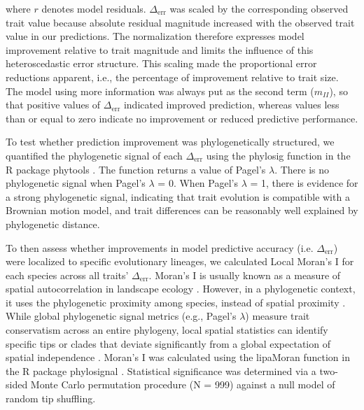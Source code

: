 \documentclass[preprint,12pt,authoryear]{elsarticle}
\begin{document}
where $r$ denotes model residuals. 
$\Delta_\mathrm{err}$ was scaled by the corresponding observed trait value because absolute residual magnitude increased with the observed trait value in our predictions. The normalization therefore expresses model improvement relative to trait magnitude and limits the influence of this heteroscedastic error structure.
This scaling made the proportional error reductions apparent, i.e., the percentage of improvement relative to trait size. The model using more information was always put as the second term ($m_{II}$), so that positive values of {$\Delta_\mathrm{err}$} indicated improved prediction, whereas values less than or equal to zero indicate no improvement or reduced predictive performance.

To test whether prediction improvement was phylogenetically structured, we quantified the phylogenetic signal of each $\Delta_\mathrm{err}$ using the phylosig function in the R package phytools \citep{revell2024phytools}. The function returns a value of Pagel's $\lambda$. There is no phylogenetic signal when Pagel's $\lambda$ = 0. When Pagel's $\lambda$ = 1, there is evidence for a strong phylogenetic signal, indicating that trait evolution is compatible with a Brownian motion model, and trait differences can be reasonably well explained by phylogenetic distance. 

To then assess whether improvements in model predictive accuracy (i.e. $\Delta_\mathrm{err}$) were localized to specific evolutionary lineages, we calculated Local Moran's I for each species across all traits' $\Delta_\mathrm{err}$. Moran's I \citep{moran1950notes} is usually known as a measure of spatial autocorrelation in landscape ecology \citep{albassatneh2023effect}. However, in a phylogenetic context, it uses the phylogenetic proximity among species, instead of spatial proximity \citep{keck2016phylosignal}. While global phylogenetic signal metrics (e.g., Pagel's $\lambda$) measure trait conservatism across an entire phylogeny, local spatial statistics can identify specific tips or clades that deviate significantly from a global expectation of spatial independence \citep{anselin1995local}. Moran's I was calculated using the lipaMoran function in the R package phylosignal \citep{keck2016phylosignal}. Statistical significance was determined via a two-sided Monte Carlo permutation procedure (N = 999) against a null model of random tip shuffling. 
\end{document}
